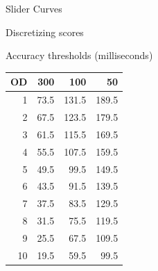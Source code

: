 \documentclass[table]{beamer}
\begin{document}
\begin{frame}{Slider Curves}

\end{frame}

\begin{frame}{Discretizing scores}
  \begin{block}{Accuracy thresholds (milliseconds)}
    \begin{center}
      \begin{tabular}{r | r r r}
        OD & 300 & 100 & 50 \\
        \hline
        1 & 73.5 & 131.5 & 189.5 \\
        2 & 67.5 & 123.5 & 179.5 \\
        3 & 61.5 & 115.5 & 169.5 \\
        4 & 55.5 & 107.5 & 159.5 \\
        5 & 49.5 & 99.5 & 149.5 \\
        6 & 43.5 & 91.5 & 139.5 \\
        7 & 37.5 & 83.5 & 129.5 \\
        8 & 31.5 & 75.5 & 119.5 \\
        9 & 25.5 & 67.5 & 109.5 \\
        10 & 19.5 & 59.5 & 99.5
      \end{tabular}
    \end{center}
  \end{block}
\end{frame}
\end{document}
